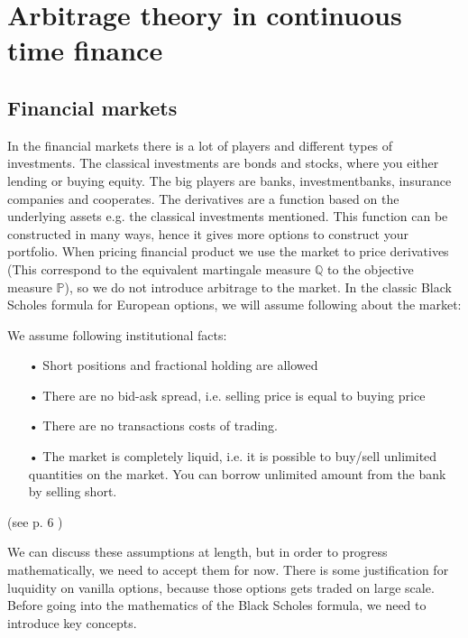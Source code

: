 
\chapter{Arbitrage theory in continuous time finance} %

\label{Chapter2} %


\section{Financial markets}

In the financial markets there is a lot of players and different types of investments. The classical investments are bonds and stocks, where you either lending or buying equity. The big players are banks, investmentbanks, insurance companies and cooperates. The derivatives are a function based on the underlying assets e.g. the classical investments mentioned. This function can be constructed in many ways, hence it gives more options to construct your portfolio. When pricing financial product we use the market to price derivatives (This correspond to the equivalent martingale measure $\mathbb{Q}$ to the objective measure $\mathbb{P}$), so we do not introduce arbitrage to the market. In the classic Black Scholes formula for European options, we will assume following about the market:
\theoremstyle{assumption}
\begin{assumption}{}\label{EfficientMarket}
We assume following institutional facts:
\begin{enumerate}
\item[•] Short positions and fractional holding are allowed 
\item[•] There are no bid-ask spread, i.e. selling price is equal to buying price
\item[•] There are no transactions costs of trading.
\item[•] The market is completely liquid, i.e. it is possible to buy/sell unlimited quantities on the market. You can borrow unlimited amount from the bank by selling short.
\end{enumerate}
(see p. 6 \parencite{finKont})
\end{assumption}
We can discuss these assumptions at length, but in order to progress mathematically, we need to accept them for now. There is some justification for luquidity on vanilla options, because those options gets traded on large scale. Before going into the mathematics of the Black Scholes formula, we need to introduce key concepts.

